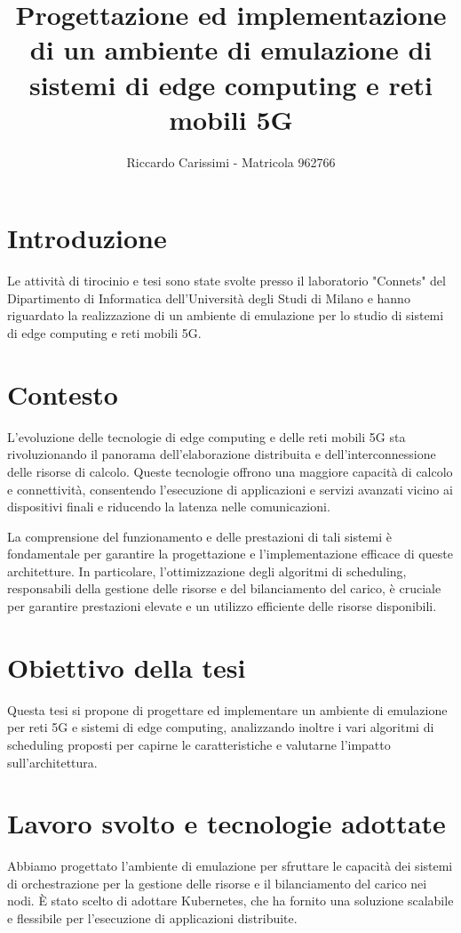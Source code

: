 \documentclass{article}
\title{\Huge Progettazione ed implementazione di un ambiente di emulazione di sistemi di edge computing e reti mobili 5G}
\author{\Large Riccardo Carissimi - Matricola 962766}
\date{}
\begin{document}
\maketitle
\Large

\section{Introduzione}
Le attività di tirocinio e tesi sono state svolte presso il laboratorio "Connets" del Dipartimento di Informatica dell'Università degli Studi di Milano e hanno riguardato la realizzazione di un ambiente di emulazione per lo studio di sistemi di edge computing e reti mobili 5G.

\section{Contesto}
L'evoluzione delle tecnologie di edge computing e delle reti mobili 5G sta rivoluzionando il panorama dell'elaborazione distribuita e dell'interconnessione delle risorse di calcolo. Queste tecnologie offrono una maggiore capacità di calcolo e connettività, consentendo l'esecuzione di applicazioni e servizi avanzati vicino ai dispositivi finali e riducendo la latenza nelle comunicazioni.

La comprensione del funzionamento e delle prestazioni di tali sistemi è fondamentale per garantire la progettazione e l'implementazione efficace di queste architetture. In particolare, l'ottimizzazione degli algoritmi di scheduling, responsabili della gestione delle risorse e del bilanciamento del carico, è cruciale per garantire prestazioni elevate e un utilizzo efficiente delle risorse disponibili.

\section{Obiettivo della tesi}

Questa tesi si propone di progettare ed implementare un ambiente di emulazione per reti 5G e sistemi di edge computing, analizzando inoltre i vari algoritmi di scheduling proposti per capirne le caratteristiche e valutarne l'impatto sull'architettura.

\section{Lavoro svolto e tecnologie adottate}

Abbiamo progettato l'ambiente di emulazione per sfruttare le capacità dei sistemi di orchestrazione per la gestione delle risorse e il bilanciamento del carico nei nodi. È stato scelto di adottare Kubernetes, che ha fornito una soluzione scalabile e flessibile per l'esecuzione di applicazioni distribuite. 
\end{document}
